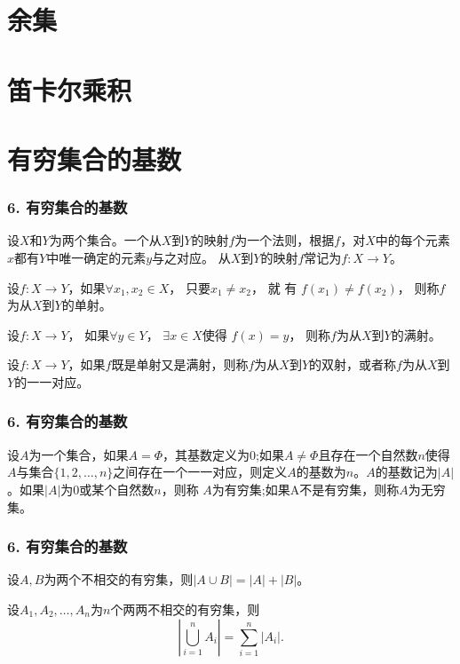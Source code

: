 \documentclass{beamer}
\begin{document}
\begin{CJK*}{UTF8}{gbsn}
\section{余集}
\section{笛卡尔乘积}
\section{有穷集合的基数}
\begin{frame}
  \frametitle{6. 有穷集合的基数}
  \begin{Def}
    设$X$和$Y$为两个集合。一个从$X$到$Y$的\alert{映射}$f$为一个法则，根据$f$，对$X$中的每个元素$x$都有$Y$中唯一确定的元素$y$与之对应。
    从$X$到$Y$的映射$f$常记为$f:X\to Y$。
  \end{Def}
    \begin{Def}
    设$f:X\to Y$，如果$\forall x_1, x_2 \in X$， 只要$x_1 \neq x_2$，  就 有 $f(x_1) \neq f(x_2)$，   则称$f$为从$X$到$Y$的\alert{单射}。
  \end{Def}
  \begin{Def}
    设$f:X\to Y$， 如果$\forall y \in Y$， $\exists x \in X$使得 $f(x) = y$， 则称$f$为从$X$到$Y$的\alert{满射}。
  \end{Def}
  \begin{Def}
    设$f:X\to Y$，如果$f$既是单射又是满射，则称$f$为从$X$到$Y$的\alert{双射}，或者称$f$为从$X$到$Y$的\alert{一一对应}。
  \end{Def}
\end{frame}

\begin{frame}
  \frametitle{6. 有穷集合的基数}

  \begin{Def}
设$A$为一个集合，如果$A=\Phi$，其\alert{基数}定义为$0$;如果$A \neq \Phi$且存在一个自然数$n$使得$A$与集合$\{1,2,\ldots, n\}$之间存在一个一一对应，则定义$A$的\alert{基数}为$n$。$A$的基数记为$|A|$。如果$|A|$为0或某个自然数$n$，则称
$A$为\alert{有穷集};如果A不是有穷集，则称$A$为\alert{无穷集}。   
  \end{Def}
\end{frame}

\begin{frame}
  \frametitle{6. 有穷集合的基数}
  \begin{Thm}
    设$A,B$为两个不相交的有穷集，则$|A \cup B| = |A| + |B|$。
  \end{Thm}
\pause
  \begin{Thm}
    设$A_1,A_2, \ldots, A_n$为$n$个两两不相交的有穷集，则\[|\bigcup_{i=1}^{n}A_i|=\sum_{i=1}^{n}|A_i|.\]
  \end{Thm}
\end{frame}


\end{CJK*}
\end{document}
